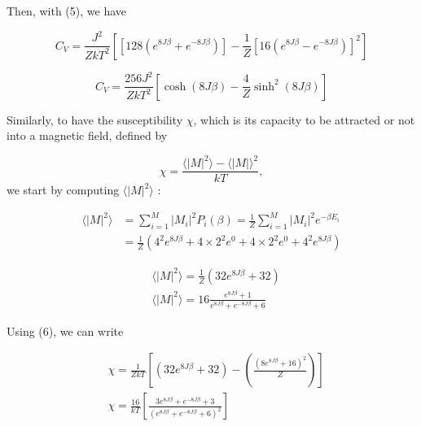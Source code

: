 \documentclass[a4paper, twoside, 11pt]{report}
\theoremstyle{theorem}
\theoremstyle{remark}
\theoremstyle{exemple}
\begin{document}
            Then, with (5), we have
            
                \begin{equation*}
                    C_V = \frac{J^2}{ZkT^2}\left[\left[128\left(e^{8J\beta} + e^{-8J\beta}\right)\right] - \frac{1}{Z}\left[16\left(e^{8J\beta}-e^{-8J\beta}\right)\right]^2\right]   
                \end{equation*}
                
                \begin{equation*}
                    \boxed{C_V = \frac{256J^2}{ZkT^2}\left[\cosh(8J\beta) - \frac{4}{Z}\sinh^2(8J\beta)\right]}
                    \tag{8}
                \end{equation*}
                
            Similarly, to have the susceptibility $\chi$, which is its capacity to be attracted or not into a magnetic field, defined by
            
                \begin{equation*}
                    \chi = \frac{\langle |M|^2 \rangle - \langle |M| \rangle ^2}{kT},
                \end{equation*}
            we start by computing $\langle |M|^2 \rangle$ :
            
                \begin{align*}
                    \langle |M|^2 \rangle &= \sum\limits_{i=1}^{M} |M_i|^2P_i(\beta) = \frac{1}{Z}\sum\limits_{i=1}^{M}|M_i|^2 e^{-\beta E_i} \\
                    &= \frac{1}{Z}\left(4^2e^{8J\beta} + 4 \times 2^2 e^{0} + 4 \times 2^2 e^{0} + 4^2e^{8J\beta}\right) 
                \end{align*}
                
                \begin{align*}
                    &\boxed{\langle |M|^2 \rangle = \frac{1}{Z}\left( 32e^{8J\beta} + 32 \right)} \tag{9}\\
                    &\langle |M|^2 \rangle = 16 \frac{e^{8J\beta}+1}{e^{8J\beta} + e^{-8J\beta} + 6}
                \end{align*}
                
            Using (6), we can write
            
                \begin{align*}
                    &\boxed{\chi = \frac{1}{ZkT}\left[\left(32e^{8J\beta}+32\right)-\left(\frac{(8e^{8J\beta}+16)^2}{Z}\right)\right]} \tag{10}\\
                    &\chi = \frac{16}{kT}\left[\frac{3e^{8J\beta}+e^{-8J\beta}+3}{(e^{8J\beta}+e^{-8J\beta}+6)^2}\right] \\
                \end{align*}            
            
\end{document}
